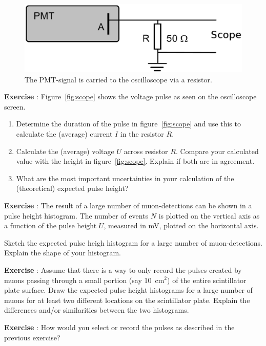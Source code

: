 \documentclass[12pt,a4paper]{article}
\numberwithin{equation}{section}
\numberwithin{figure}{section}
\newcounter{Exercise}
\numberwithin{table}{section}
\begin{document}
\begin{figure}\begin{center}
\includegraphics[scale=0.38]{PMT_connection.eps}%
\caption{The PMT-signal is carried to the oscilloscope via a resistor. }\label{fig:PMT_connection}
\end{center}\end{figure}

\begin{shaded}
\textbf{Exercise \theExercise {}} : Figure~\ref{fig:scope} shows the voltage pulse as seen on the oscilloscope screen.
\begin{enumerate}[-]
\item Determine the duration of the pulse in figure~\ref{fig:scope} and use this to calculate the (average) current $I$ in the resistor $R$.
\item Calculate the (average) voltage $U$ across resistor $R$. Compare your calculated value with the height in figure~\ref{fig:scope}. Explain if both are in agreement.
\item What are the most important uncertainties in your calculation of the (theoretical) expected pulse height?
\end{enumerate}
\end{shaded}

\begin{shaded}
\textbf{Exercise \theExercise {}} : The result of a large number of muon-detections can be shown in a pulse height histogram. The number of events $N$ is plotted on the vertical axis as a function of the pulse height $U$, measured in mV, plotted on the horizontal axis.

Sketch the expected pulse heigh histogram for a large number of muon-detections. Explain the shape of your histogram.
\end{shaded}

\begin{shaded}
\textbf{Exercise \theExercise {}} : Assume that there is a way to only record the pulses created by muons passing through a small portion (say 10~cm$^2$) of the entire scintillator plate surface. Draw the expected pulse height histograms for a large number of muons for at least two different locations on the scintillator plate. Explain the differences and/or similarities between the two histograms.\end{shaded}

\begin{shaded}
\textbf{Exercise \theExercise {}} : How would you select or record the pulses as described in the previous exercise?\end{shaded}
\end{document}
